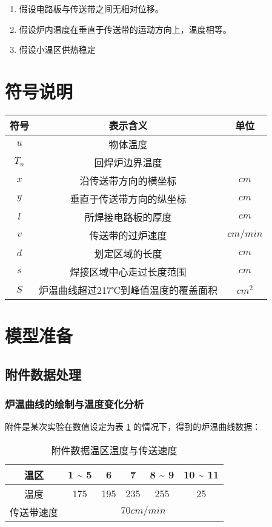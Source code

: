 \documentclass[withoutpreface,bwprint]{cumcmthesis} %
\numberwithin{equation}{subsection}
\begin{document}
\begin{enumerate}[label=(\arabic*)]
	\item
	假设电路板与传送带之间无相对位移。
	\item
	假设炉内温度在垂直于传送带的运动方向上，温度相等。
	\item
	假设小温区供热稳定

	
\end{enumerate}






\section{符号说明}


\begin{table}[h]
	\centering
	\begin{tabular}{ccc}
		\toprule[1.5pt]
		符号   &    表示含义 &   单位  \\
		\midrule[1pt]
		$u$ & 物体温度 & \textcelsius  \\
		$T_{n}$ & 回焊炉边界温度 & \textcelsius \\
		$x$& 沿传送带方向的横坐标 &  $cm$ \\
		$y$& 垂直于传送带方向的纵坐标 &  $cm$   \\
		$l$& 所焊接电路板的厚度 &   $cm$  \\
		$v$& 传送带的过炉速度 &   $cm/min$  \\
		$d$& 划定区域的长度 &    $cm$ \\
		$s$& 焊接区域中心走过长度范围 &   $cm$  \\
		$S$& 炉温曲线超过217℃到峰值温度的覆盖面积 &   $cm^2$  \\
		\bottomrule[1.5pt]
		
	\end{tabular}
\end{table}

\section{模型准备}
\subsection{附件数据处理}
\subsubsection{炉温曲线的绘制与温度变化分析}
 附件是某次实验在数值设定为表 \ref{speed_1}   的情况下，得到的炉温曲线数据：
\begin{table}[!htbp]
 	\caption[speed1]{附件数据温区温度与传送速度}
 	\label{speed_1}
 	\centering
 	\begin{tabular}{cccccc}
 		\toprule[2.0pt]
		温区 & 1 \~{} 5 & 6 & 7 & 8 \~{} 9 & 10 \~{} 11\\
 		\midrule[1pt]
 		温度 & 175\textcelsius & 195\textcelsius & 235\textcelsius & 255\textcelsius &  25\textcelsius \\
 		\midrule[1pt]
 		传送带速度 &\multicolumn{5}{c}{$70cm/min$}\\
 		\bottomrule[2.0pt]
 	\end{tabular}
\end{table}
\end{document}
